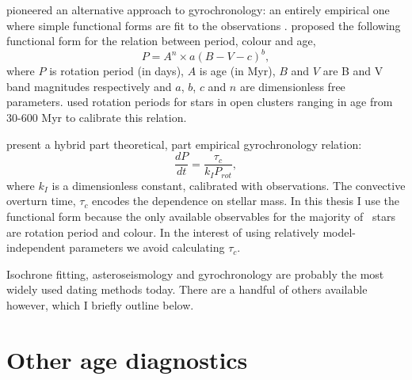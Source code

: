 \citet{Barnes2003} pioneered an alternative approach to gyrochronology: an
entirely empirical one where simple functional forms are fit to the
observations \citep[\eg][]{Barnes2007, Mamajek2008}.
\citet{Barnes2003} proposed the following functional form for the relation
between period, colour and age,
\begin{equation}
P = A^n \times a(B-V-c)^b,
\end{equation}
\label{eq:Barnes2007_2}
where $P$ is rotation period (in days),
$A$ is age (in Myr), $B$ and $V$ are B and V band magnitudes respectively and
$a$, $b$, $c$ and $n$ are dimensionless free parameters.
\citet{Barnes2007} used rotation periods for stars in open clusters ranging in
age from 30-600 Myr to calibrate this relation.

\citet{Barnes2010b} present a hybrid part theoretical, part empirical
gyrochronology relation:
\begin{equation}
\frac{dP}{dt} = \frac{\tau_c}{k_IP_{rot}},
\end{equation}
where $k_I$ is a dimensionless constant, calibrated with observations.
The convective overturn time, $\tau_c$ encodes the dependence on stellar mass.
In this thesis I use the \citet{Barnes2003} functional form because the only
available observables for the majority of \kepler\ stars are rotation period
and colour.
In the interest of using relatively model-independent parameters we avoid
calculating $\tau_c$.

Isochrone fitting, asteroseismology and gyrochronology are probably the most
widely used dating methods today.
There are a handful of others available however, which I briefly outline
below.

\section{Other age diagnostics}
\label{sec:activity}

